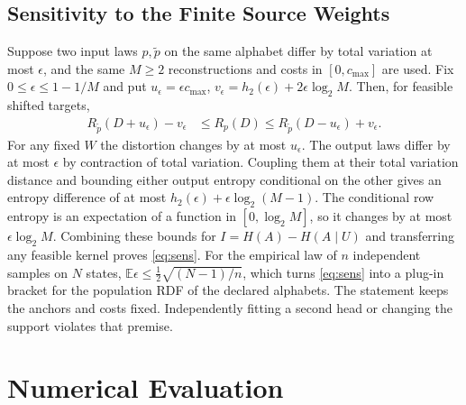 \documentclass[10pt,journal]{IEEEtran}
\newcommand{\E}{\mathbb E}
\begin{document}
\subsection{Sensitivity to the Finite Source Weights}
Suppose two input laws $p,\tilde p$ on the same alphabet differ by total variation at most $\epsilon$, and the same $M\ge2$ reconstructions and costs in $[0,c_{\max}]$ are used. Fix $0\le\epsilon\le1-1/M$ and put $u_\epsilon=\epsilon c_{\max}$, $v_\epsilon=h_2(\epsilon)+2\epsilon\log_2 M$. Then, for feasible shifted targets,
\begin{align}
 R_{\tilde p}(D+u_\epsilon)-v_\epsilon&\le R_p(D)\le R_{\tilde p}(D-u_\epsilon)+v_\epsilon . \label{eq:sens}
\end{align}
For any fixed $W$ the distortion changes by at most $u_\epsilon$. The output laws differ by at most $\epsilon$ by contraction of total variation. Coupling them at their total variation distance and bounding either output entropy conditional on the other gives an entropy difference of at most $h_2(\epsilon)+\epsilon\log_2(M-1)$. The conditional row entropy is an expectation of a function in $[0,\log_2 M]$, so it changes by at most $\epsilon\log_2 M$. Combining these bounds for $I=H(A)-H(A\mid U)$ and transferring any feasible kernel proves \eqref{eq:sens}. For the empirical law of $n$ independent samples on $N$ states, $\E\epsilon\le\frac12\sqrt{(N-1)/n}$, which turns \eqref{eq:sens} into a plug-in bracket for the population RDF of the declared alphabets. The statement keeps the anchors and costs fixed. Independently fitting a second head or changing the support violates that premise.

\section{Numerical Evaluation}\label{sec:results}
\end{document}
